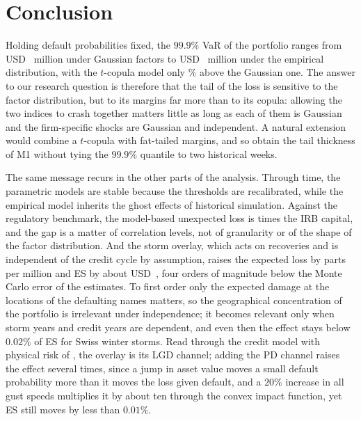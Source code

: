 \section{Conclusion}
\label{sec:conclusion}

Holding default probabilities fixed, the $99.9\%$ VaR of the portfolio ranges from USD~ million under Gaussian factors to USD~ million under the empirical distribution, with the $t$-copula model only \% above the Gaussian one. The answer to our research question is therefore that the tail of the loss is sensitive to the factor distribution, but to its margins far more than to its copula: allowing the two indices to crash together matters little as long as each of them is Gaussian and the firm-specific shocks are Gaussian and independent. A natural extension would combine a $t$-copula with fat-tailed margins, and so obtain the tail thickness of M1 without tying the $99.9\%$ quantile to two historical weeks.

The same message recurs in the other parts of the analysis. Through time, the parametric models are stable because the thresholds are recalibrated, while the empirical model inherits the ghost effects of historical simulation. Against the regulatory benchmark, the model-based unexpected loss is  times the IRB capital, and the gap is a matter of correlation levels, not of granularity or of the shape of the factor distribution. And the storm overlay, which acts on recoveries and is independent of the credit cycle by assumption, raises the expected loss by  parts per million and ES by about USD~, four orders of magnitude below the Monte Carlo error of the estimates. To first order only the expected damage at the locations of the defaulting names matters, so the geographical concentration of the portfolio is irrelevant under independence; it becomes relevant only when storm years and credit years are dependent, and even then the effect stays below $0.02\%$ of ES for Swiss winter storms. Read through the credit model with physical risk of \citet{Pozdyshev25}, the overlay is its LGD channel; adding the PD channel raises the effect several times, since a jump in asset value moves a small default probability more than it moves the loss given default, and a $20\%$ increase in all gust speeds multiplies it by about ten through the convex impact function, yet ES still moves by less than $0.01\%$.

